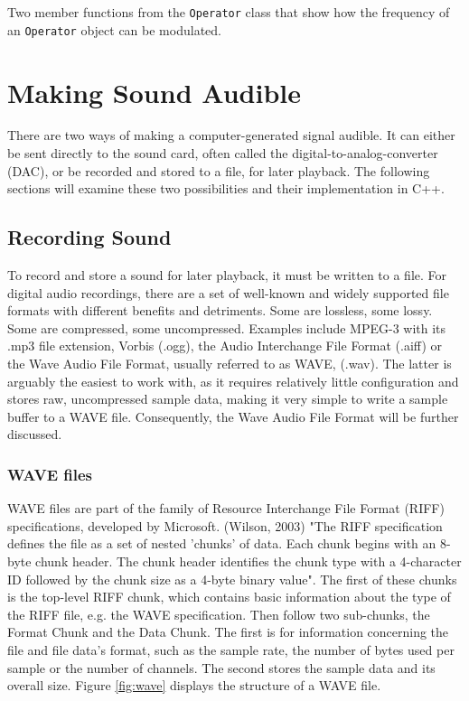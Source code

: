 \documentclass[12pt,twoside]{report}
\begin{document}
\begin{table}[hb!]
  \caption{Two member functions from the \texttt{Operator} class that show how the frequency of an \texttt{Operator} object can be modulated.}
  \label{code:operator}
\end{table}

\chapter{Making Sound Audible}

There are two ways of making a computer-generated signal audible. It can either be sent directly to the sound card, often called the digital-to-analog-converter (DAC), or be recorded and stored to a file, for later playback. The following sections will examine these two possibilities and their implementation in C++.

\section{Recording Sound}

To record and store a sound for later playback, it must be written to a file. For digital audio recordings, there are a set of well-known and widely supported file formats with different benefits and detriments. Some are lossless, some lossy. Some are compressed, some uncompressed. Examples include MPEG-3 with its .mp3 file extension, Vorbis (.ogg), the Audio Interchange File Format (.aiff) or the Wave Audio File Format, usually referred to as WAVE, (.wav). The latter is arguably the easiest to work with, as it requires relatively little configuration and stores raw, uncompressed sample data, making it very simple to write a sample buffer to a WAVE file. Consequently, the Wave Audio File Format will be further discussed.\\

\subsection{WAVE files}

\noindent WAVE files are part of the family of Resource Interchange File Format (RIFF) specifications, developed by Microsoft. (Wilson, 2003) "The RIFF specification defines the file as a set of nested 'chunks' of data. Each chunk begins with an 8-byte chunk header. The chunk header identifies the chunk type with a 4-character ID followed by the chunk size as a 4-byte binary value".  The first of these chunks is the top-level RIFF chunk, which contains basic information about the type of the RIFF file, e.g. the WAVE specification. Then follow two sub-chunks, the Format Chunk and the Data Chunk. The first is for information concerning the file and file data's format, such as the sample rate, the number of bytes used per sample or the number of channels. The second stores the sample data and its overall size. Figure \ref{fig:wave} displays the structure of a WAVE file.
\end{document}
